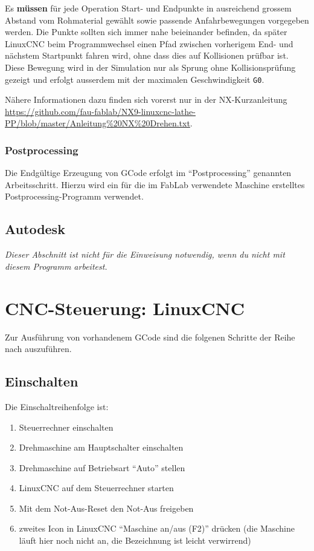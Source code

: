 \documentclass{\basedir/fablab-document}
\begin{document}
Es \textbf{müssen} für jede Operation Start- und Endpunkte in ausreichend grossem Abstand vom Rohmaterial gewählt sowie passende Anfahrbewegungen vorgegeben werden. Die Punkte sollten sich immer nahe beieinander befinden, da später LinuxCNC beim Programmwechsel einen Pfad zwischen vorherigem End- und nächstem Startpunkt fahren wird, ohne dass dies auf Kollisionen prüfbar ist.
Diese Bewegung wird in der Simulation nur als Sprung ohne Kollisionsprüfung gezeigt und erfolgt ausserdem mit der maximalen Geschwindigkeit \texttt{G0}.

Nähere Informationen dazu finden sich vorerst nur in der NX-Kurzanleitung \url{https://github.com/fau-fablab/NX9-linuxcnc-lathe-PP/blob/master/Anleitung%20NX%20Drehen.txt}.

\subsubsection{Postprocessing}

Die Endgültige Erzeugung von GCode erfolgt im "`Postprocessing"' genannten Arbeitsschritt. Hierzu wird ein für die im FabLab verwendete Maschine erstelltes Postprocessing-Programm verwendet. 

\subsection{Autodesk}
\emph{Dieser Abschnitt ist nicht für die Einweisung notwendig, wenn du nicht mit diesem Programm arbeitest.}


\section{CNC-Steuerung: LinuxCNC}

Zur Ausführung von vorhandenem GCode sind die folgenen Schritte der Reihe nach auszuführen.

\subsection{Einschalten}
Die Einschaltreihenfolge ist:
\begin{enumerate}
	\item Steuerrechner einschalten
	\item Drehmaschine am Hauptschalter einschalten
	\item Drehmaschine auf Betriebsart \enquote{Auto} stellen
	\item LinuxCNC auf dem Steuerrechner starten
	\item Mit dem Not-Aus-Reset den Not-Aus freigeben
	\item zweites Icon in LinuxCNC "`Maschine an/aus (F2)"' drücken (die Maschine läuft hier noch nicht an, die Bezeichnung ist leicht verwirrend)
\end{enumerate}
\end{document}
